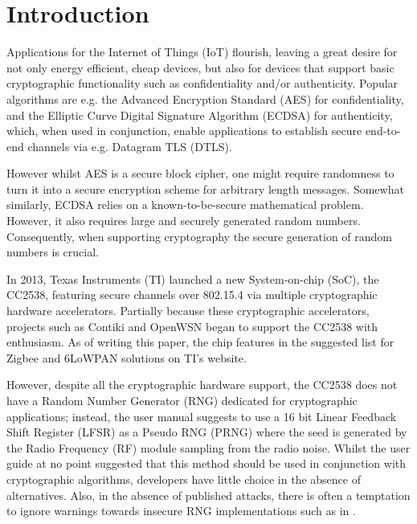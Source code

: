 \section{Introduction}
Applications for the Internet of Things (IoT) flourish, leaving a great desire for not only energy efficient, cheap devices, but also for devices that support basic cryptographic functionality such as confidentiality and/or authenticity. Popular algorithms are e.g. the Advanced Encryption Standard\cite{AES} (AES) for confidentiality, and the Elliptic Curve Digital Signature Algorithm\cite{ECDSA} (ECDSA) for authenticity, which, when used in conjunction, enable applications to establish secure end-to-end channels via e.g. Datagram TLS\cite{DTLS} (DTLS). 

However whilst AES is a secure block cipher, one might require randomness to turn it into a secure encryption scheme for arbitrary length messages. Somewhat similarly, ECDSA relies on a known-to-be-secure mathematical problem. However, it also requires large and securely generated random numbers. Consequently, when supporting cryptography the secure generation of random numbers is crucial. 


In 2013, Texas Instruments (TI) launched a new System-on-chip (SoC), the CC2538\cite{CC2538}, featuring secure channels over 802.15.4 via multiple cryptographic hardware accelerators. Partially because these cryptographic accelerators, projects such as Contiki\cite{Contiki} and OpenWSN\cite{OpenWSN} began to support the CC2538 with enthusiasm. As of writing this paper, the chip features in the suggested list for Zigbee and 6LoWPAN solutions on TI's website\cite{ZigbeeProducts}.

However, despite all the cryptographic hardware support, the CC2538 does not have a Random Number Generator (RNG) dedicated for cryptographic applications; instead, the user manual suggests to use a 16 bit Linear Feedback Shift Register (LFSR) as a Pseudo RNG (PRNG) where the seed is generated by the Radio Frequency (RF) module sampling from the radio noise. Whilst the user guide at no point suggested that this method should be used in conjunction with cryptographic algorithms, developers have little choice in the absence of alternatives. Also, in the absence of published attacks, there is often a temptation to ignore warnings towards insecure RNG implementations such as in \cite{SmartMeterBlog}. 

